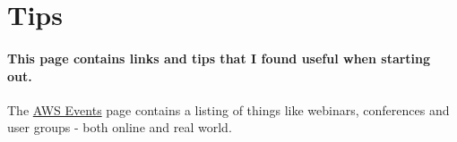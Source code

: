 \section{Tips}

\paragraph{This page contains links and tips that I found useful when starting out.}

The \href{https://aws.amazon.com/about-aws/events/}{AWS Events} page contains a listing of things like webinars, conferences and user groups - both online and real world.
